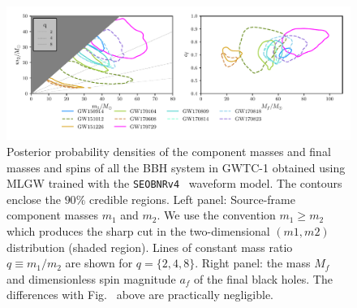 \begin{figure}[t]
	\centering
    \includegraphics[width=\textwidth]{img/posterior_masses_final_seob.pdf}
	\caption{
	Posterior probability densities of the component masses and final masses and spins 
	of all the BBH system in GWTC-1 obtained using MLGW trained with the {\tt SEOBNRv4}~\cite{Bohe:2016gbl}
	waveform model. The contours enclose the $90\%$ credible regions.
	Left panel: Source-frame component masses $m_1$ and $m_2$. We use the convention $m_1\geq m_2$ which 
	produces the sharp cut in the two-dimensional $(m1,m2)$ distribution (shaded region). Lines of
	constant mass ratio $q\equiv m_1/m_2$ are shown for $q=\{2,4,8\}$. Right panel: the mass $M_f$
	and dimensionless spin magnitude $a_f$ of the final black holes. The differences with 
	Fig.~\cite{fig:gwtc1-summary} above are practically negligible.}
	\label{fig:gwtc1-summary_seob}
\end{figure}

